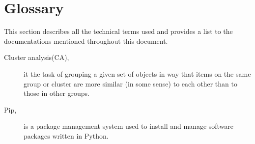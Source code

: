 \chapter{Glossary}

This section describes all the technical terms used and provides a list to the documentations mentioned throughout this document.

\label{sec:terms}

\begin{description}
\item [Cluster analysis(CA), ] it the task of grouping a given set of objects in way that items on the same group or cluster are more similar (in some sense) to each other than to those in other groups. 

\item [Pip,] is a package management system used to install and manage software packages written in Python.


\end{description}
